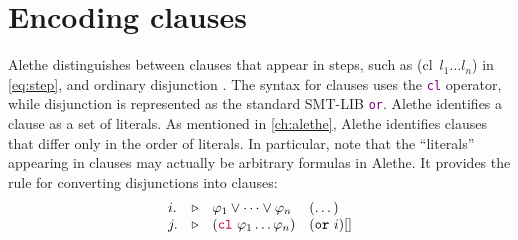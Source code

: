 \section{Encoding clauses}

Alethe distinguishes between clauses that appear in steps, such as \colorbox{Emerald!30}{(cl~$l_1 \dots l_n$)} in \cref{eq:step}, and ordinary disjunction \cite[\S 4]{alethespec}.
The syntax for clauses uses the \textcolor{purple}{\texttt{cl}} operator, while disjunction is represented as the standard SMT-LIB \textcolor{purple}{\texttt{or}}.
Alethe identifies a clause as a set of literals. As mentioned in \cref{ch:alethe}, Alethe identifies clauses that differ only in the order of literals. In particular, note that the ``literals'' appearing in clauses may actually be arbitrary formulas in Alethe.
It provides the  rule for converting disjunctions into clauses:
\[
\begin{matrix*}[l]
  i. & \triangleright & \varphi_1 \lor \dots \lor \varphi_n  & (\dots) \\
  j. & \triangleright & (\texttt{\textcolor{purple}{cl}}~\varphi_1 \dots \varphi_n)  & (\kw{or}~i)[] \\
\end{matrix*}
\]


